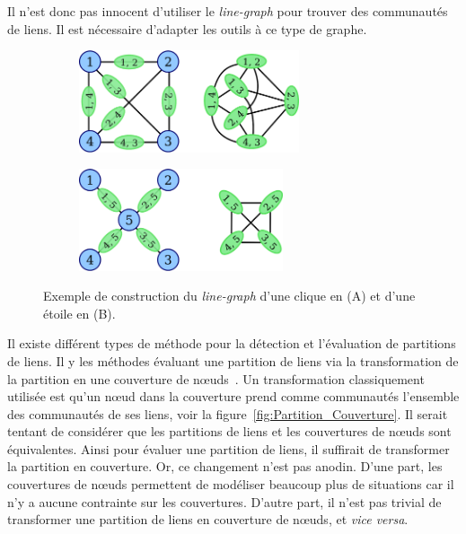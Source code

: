 Il n'est donc pas innocent d'utiliser le \emph{line-graph} pour trouver des communautés de liens.
Il est nécessaire d'adapter les outils à ce type de graphe.
\begin{figure}
\centering
	\hfill
	\begin{subfigure}{0.4\textwidth}
		\includegraphics[height=3cm]{img/ExpectedNodes/Example/transfo_clique}
		\caption{}
		\label{fig:ex_lineG_clique}	
	\end{subfigure}\hfill
	\begin{subfigure}{0.4\textwidth}
		\includegraphics[height=3cm]{img/ExpectedNodes/Example/transfo_etoile}
		\caption{}
		\label{fig:ex_lineG_etoile}	
	\end{subfigure}
	\hfill		

	\caption{Exemple de construction du \emph{line-graph} d'une clique en (A) et d'une étoile en (B).}
	\label{fig:fail_construction_lineG}
\end{figure}



Il existe différent types de méthode pour la détection et l'évaluation de partitions de liens.
Il y les méthodes évaluant une partition de liens via la transformation de la partition en une couverture de n\oe uds~\cite{Huang2013,Lim2014,Wu2010a}.
Un transformation classiquement utilisée est qu'un n\oe ud dans la couverture prend comme communautés l'ensemble des communautés de ses liens, voir la figure~\ref{fig:Partition_Couverture}.
Il serait tentant de considérer que les partitions de liens et les couvertures de n\oe uds sont équivalentes.
Ainsi pour évaluer une partition de liens, il suffirait de transformer la partition en couverture.
Or, ce changement n'est pas anodin.
D'une part, les couvertures de n\oe uds permettent de modéliser beaucoup plus de situations car il n'y a aucune contrainte sur les couvertures.
D'autre part, il n'est pas trivial de transformer une partition de liens en couverture de n\oe uds, et \emph{vice versa}.

